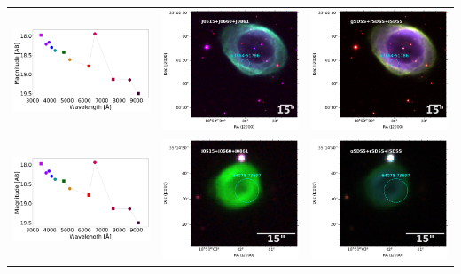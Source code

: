 \begin{table}
\begin{tabular}{ccc}
\includegraphics[width=0.3\linewidth, clip]{figs-pca/photospectrum_64343-69243-Missing-pne-allinf-v2_MAG_APER_6_0.pdf} & \includegraphics[width=0.3\linewidth, clip]{Field_63864/1000001-JPLUS-01066-v202006_J0861_63864-51786-RGB.pdf} & \includegraphics[width=0.3\linewidth, clip]{Field_63864/1000001-JPLUS-01066-v202006_iSDSS_63864-51786-RGB.pdf} \\
\includegraphics[width=0.3\linewidth, clip]{figs-pca/photospectrum_64343-69243-Missing-pne-allinf-v2_MAG_APER_6_0.pdf} & \includegraphics[width=0.3\linewidth, clip]{Field_64078/1000001-JPLUS-01172-v202006_J0861_64078-73697-RGB.pdf} & \includegraphics[width=0.3\linewidth, clip]{Field_64078/1000001-JPLUS-01172-v202006_iSDSS_64078-73697-RGB.pdf} \\

\end{tabular}
\end{table}

